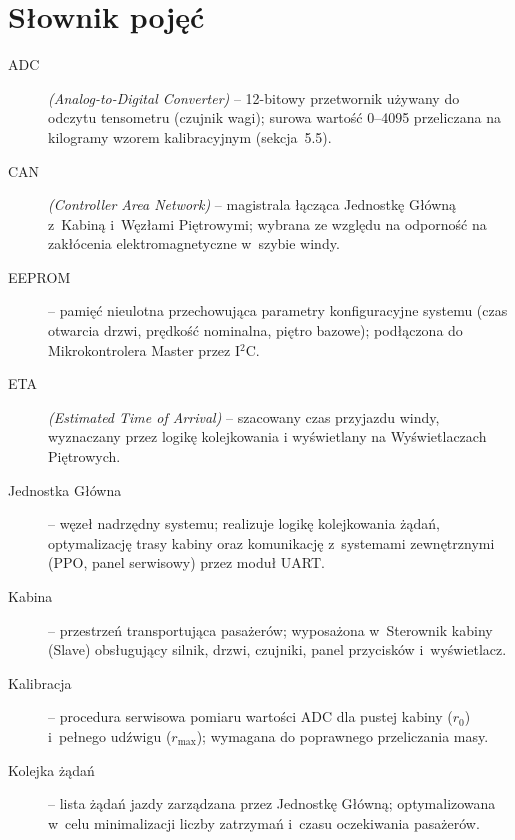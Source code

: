 \documentclass{article}
\begin{document}
\maketitle

\section*{Słownik pojęć}
 
\begin{description}
 
  \item[ADC] \textit{(Analog-to-Digital Converter)} – 12-bitowy przetwornik używany do odczytu tensometru (czujnik wagi); surowa wartość 0–4095 przeliczana na kilogramy wzorem kalibracyjnym (sekcja~5.5).
 
  \item[CAN] \textit{(Controller Area Network)} – magistrala łącząca Jednostkę Główną z~Kabiną i~Węzłami Piętrowymi; wybrana ze względu na odporność na zakłócenia elektromagnetyczne w~szybie windy.
 
  \item[EEPROM] – pamięć nieulotna przechowująca parametry konfiguracyjne systemu (czas otwarcia drzwi, prędkość nominalna, piętro bazowe); podłączona do Mikrokontrolera Master przez I$^2$C.
 
  \item[ETA] \textit{(Estimated Time of Arrival)} – szacowany czas przyjazdu windy, wyznaczany przez logikę kolejkowania i wyświetlany na Wyświetlaczach Piętrowych.
 
  \item[Jednostka Główna] – węzeł nadrzędny systemu; realizuje logikę kolejkowania żądań, optymalizację trasy kabiny oraz komunikację z~systemami zewnętrznymi (PPO, panel serwisowy) przez moduł UART.
 
  \item[Kabina] – przestrzeń transportująca pasażerów; wyposażona w~Sterownik kabiny (Slave) obsługujący silnik, drzwi, czujniki, panel przycisków i~wyświetlacz.
 
  \item[Kalibracja] – procedura serwisowa pomiaru wartości ADC dla pustej kabiny ($r_0$) i~pełnego udźwigu ($r_\text{max}$); wymagana do poprawnego przeliczania masy.
 
  \item[Kolejka żądań] – lista żądań jazdy zarządzana przez Jednostkę Główną; optymalizowana w~celu minimalizacji liczby zatrzymań i~czasu oczekiwania pasażerów.
 

\end{description}
\end{document}
